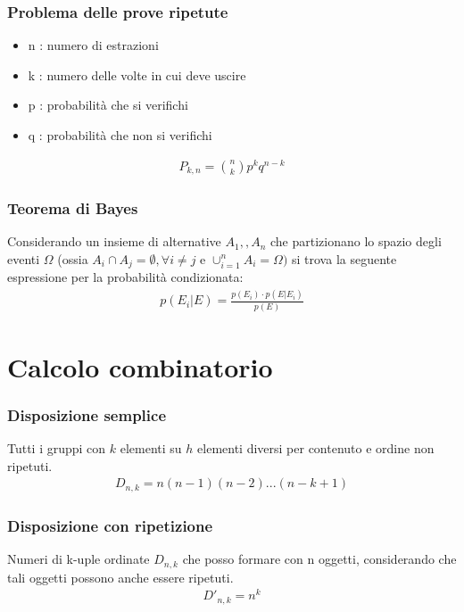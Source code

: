 \documentclass[a4paper]{article}
\begin{document}
	\subsubsection{Problema delle prove ripetute}
	\begin{itemize}
		\item n : numero di estrazioni
		\item k : numero delle volte in cui deve uscire
		\item p : probabilità che si verifichi
		\item q : probabilità che non si verifichi
	\end{itemize}

	\begin{align*}
		P_{k,n} = {{n}\choose{k}} p^kq^{n-k}
	\end{align*}
	
	\subsubsection{Teorema di Bayes}
	Considerando un insieme di alternative $A_{1}, ,A_{n}$ che partizionano lo spazio degli eventi $\Omega$ (ossia $A_{i} \cap A_{j} = \emptyset , \forall i\neq j$ e $\cup _{{i=1}}^{n}A_{i}=\Omega )$ si trova la seguente espressione per la probabilità condizionata:
	\begin{align*}
		p(E_i|E)= \frac{p(E_i) \cdot p(E | E_i)}{p(E)}
	\end{align*}
	
	\newpage
	\section{Calcolo combinatorio}
	\subsubsection{Disposizione semplice}
	Tutti i gruppi con $k$ elementi su $h$ elementi diversi per contenuto e ordine non ripetuti.
	\begin{align*}
		D_{n,k} = n(n-1)(n-2)...(n-k+1)
	\end{align*}

	\subsubsection{Disposizione con ripetizione}
	Numeri di k-uple ordinate $D_{n,k}$ che posso formare con n oggetti, considerando che tali oggetti possono anche essere ripetuti.
	\begin{align*}
		D'_{n,k} = n^k
	\end{align*}
\end{document}
